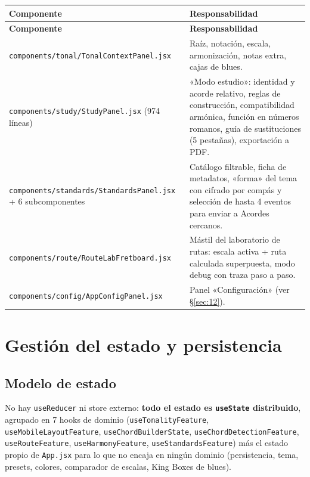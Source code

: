 \documentclass[a4paper,11pt,oneside]{report}
\newcommand{\Sref}[1]{\S\ref{#1}}
\begin{document}
\begin{center}
\begin{longtable}{L{5.0cm}L{9.3cm}}
\toprule
{}\textbf{Componente} & \textbf{Responsabilidad}\\
\midrule
\endfirsthead
{}\textbf{Componente} & \textbf{Responsabilidad}\\
\midrule
\endhead
\bottomrule
\endlastfoot
\lstinline!components/tonal/TonalContextPanel.jsx! & Raíz, notación, escala, armonización, notas extra, cajas de blues.\\
\lstinline!components/study/StudyPanel.jsx! (974 líneas) & «Modo estudio»: identidad y acorde relativo, reglas de construcción, compatibilidad armónica, función en números romanos, guía de sustituciones (5 pestañas), exportación a PDF.\\
\lstinline!components/standards/StandardsPanel.jsx! + 6 subcomponentes & Catálogo filtrable, ficha de metadatos, «forma» del tema con cifrado por compás y selección de hasta 4 eventos para enviar a Acordes cercanos.\\
\lstinline!components/route/RouteLabFretboard.jsx! & Mástil del laboratorio de rutas: escala activa + ruta calculada superpuesta, modo debug con traza paso a paso.\\
\lstinline!components/config/AppConfigPanel.jsx! & Panel «Configuración» (ver \Sref{sec:12}).\\
\end{longtable}
\end{center}

\chapter{Gestión del estado y persistencia}
\label{sec:6}

\section{Modelo de estado}
\label{sec:6.1}

No hay \lstinline!useReducer! ni store externo: \textbf{todo el estado es \lstinline!useState! distribuido}, agrupado en 7 hooks de dominio (\lstinline!useTonalityFeature!, \lstinline!useMobileLayoutFeature!, \lstinline!useChordBuilderState!, \lstinline!useChordDetectionFeature!, \lstinline!useRouteFeature!, \lstinline!useHarmonyFeature!, \lstinline!useStandardsFeature!) más el estado propio de \lstinline!App.jsx! para lo que no encaja en ningún dominio (persistencia, tema, presets, colores, comparador de escalas, King Boxes de blues).
\end{document}
